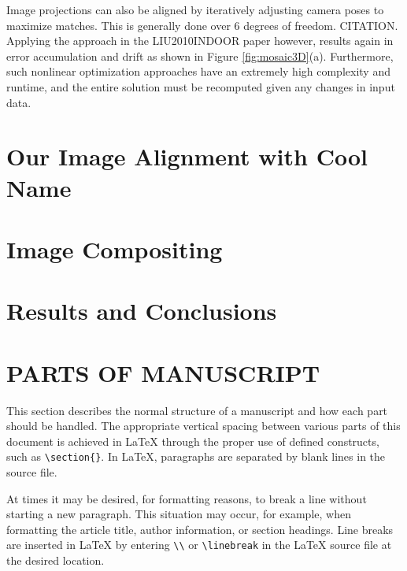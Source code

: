 \documentclass[]{spie}  %
\begin{document}
Image projections can also be aligned by iteratively adjusting camera poses to maximize matches. This is generally done over 6 degrees of freedom. CITATION. Applying the approach in the LIU2010INDOOR paper however, results again in error accumulation and drift as shown in Figure \ref{fig:mosaic3D}(a). Furthermore, such nonlinear optimization approaches have an extremely high complexity and runtime, and the entire solution must be recomputed given any changes in input data.







\section{Our Image Alignment with Cool Name}
\section{Image Compositing}
\section{Results and Conclusions}


\section{PARTS OF MANUSCRIPT}

This section describes the normal structure of a manuscript and how
each part should be handled.  The appropriate vertical spacing between
various parts of this document is achieved in LaTeX through the proper
use of defined constructs, such as \verb|\section{}|.  In LaTeX,
paragraphs are separated by blank lines in the source file.

At times it may be desired, for formatting reasons, to break a line
without starting a new paragraph.  This situation may occur, for
example, when formatting the article title, author information, or
section headings.  Line breaks are inserted in LaTeX by entering
\verb|\\| or \verb|\linebreak| in the LaTeX source file at the desired
location.

\end{document}

